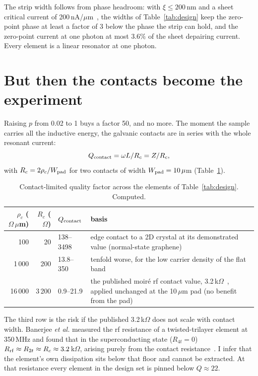 \documentclass[aps,prb,reprint,superscriptaddress,longbibliography]{revtex4-2}
\begin{document}
The strip width follows from phase headroom: with $\xi \leq 200$\,nm
and a sheet critical current of 200\,nA/$\mu$m~\cite{Jha2025}, the
widths of Table~\ref{tab:design} keep the zero-point phase at least a
factor of 3 below the phase the strip can hold, and the zero-point current at one
photon at most 3.6\% of the sheet depairing current. Every element is a
linear resonator at one photon.

\section{But then the contacts become the experiment}
\label{sec:contacts}

Raising $p$ from 0.02 to 1 buys a factor 50, and no more. The moment the
sample carries all the inductive energy, the galvanic contacts are in
series with the whole resonant current:
\begin{equation}
Q_{\rm contact} = \omega L/R_c = Z/R_c ,
\label{eq:qc}
\end{equation}
with $R_c = 2\rho_c/W_{\rm pad}$ for two contacts of width $W_{\rm pad}
= 10\,\mu$m (Table~\ref{tab:contacts}).

\begin{table}[!tbp]
\caption{\label{tab:contacts}Contact-limited quality factor across the
elements of Table~\ref{tab:design}. Computed.}
\begin{ruledtabular}
\begin{tabular}{rrlp{}}
$\rho_c$ ($\Omega\,\mu$m) & $R_c$ ($\Omega$) & $Q_{\rm contact}$ & \raggedright basis \tabularnewline
\hline
100 & 20 & 138--3498 & \raggedright edge contact to a 2D crystal at its demonstrated value (normal-state graphene)~\cite{Wang2013} \tabularnewline
1\,000 & 200 & 13.8--350 & \raggedright tenfold worse, for the low carrier density of the flat band \tabularnewline
16\,000 & 3\,200 & 0.9--21.9 & \raggedright the published moir\'e rf contact value, 3.2\,k$\Omega$~\cite{Banerjee2025}, applied unchanged at the 10\,$\mu$m pad (no benefit from the pad) \tabularnewline
\end{tabular}
\end{ruledtabular}
\end{table}

The third row is the risk if the published 3.2\,k$\Omega$ does not
scale with contact width. Banerjee \emph{et al.} measured the rf
resistance of a twisted-trilayer element at 350\,MHz and found that in
the superconducting state ($R_{4t} = 0$) $R_{\rm rf} \approx R_{2t}
\approx R_c \approx 3.2$\,k$\Omega$, arising purely from the contact
resistance~\cite{Banerjee2025}. I infer that the element's own
dissipation sits below that floor and cannot be extracted. At that
resistance every element in the design set is pinned below $Q \approx
22$.
\end{document}
